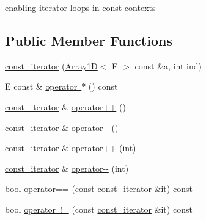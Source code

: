 enabling iterator loops in const contexts \subsection*{Public Member Functions}
\begin{DoxyCompactItemize}
\item 
\mbox{\hyperlink{classbridges_1_1datastructure_1_1_array1_d_1_1const__iterator_a1ea421b46a3f0907190a91752e1f5b32}{const\+\_\+iterator}} (\mbox{\hyperlink{classbridges_1_1datastructure_1_1_array1_d}{Array1D}}$<$ E $>$ const \&a, int ind)
\item 
E const  \& \mbox{\hyperlink{classbridges_1_1datastructure_1_1_array1_d_1_1const__iterator_a66a228b90b4be506b83ae663f772b1ef}{operator $\ast$}} () const
\item 
\mbox{\hyperlink{classbridges_1_1datastructure_1_1_array1_d_1_1const__iterator}{const\+\_\+iterator}} \& \mbox{\hyperlink{classbridges_1_1datastructure_1_1_array1_d_1_1const__iterator_a754c1601b52473d4c8abc5e20af62b81}{operator++}} ()
\item 
\mbox{\hyperlink{classbridges_1_1datastructure_1_1_array1_d_1_1const__iterator}{const\+\_\+iterator}} \& \mbox{\hyperlink{classbridges_1_1datastructure_1_1_array1_d_1_1const__iterator_a700c9de64036c2cb61836e1ddc23cc1c}{operator-\/-\/}} ()
\item 
\mbox{\hyperlink{classbridges_1_1datastructure_1_1_array1_d_1_1const__iterator}{const\+\_\+iterator}} \& \mbox{\hyperlink{classbridges_1_1datastructure_1_1_array1_d_1_1const__iterator_aa7eb1bbe97e8f3257dc7d850be8f5937}{operator++}} (int)
\item 
\mbox{\hyperlink{classbridges_1_1datastructure_1_1_array1_d_1_1const__iterator}{const\+\_\+iterator}} \& \mbox{\hyperlink{classbridges_1_1datastructure_1_1_array1_d_1_1const__iterator_a815972df8b28780f88dac8133322e8ab}{operator-\/-\/}} (int)
\item 
bool \mbox{\hyperlink{classbridges_1_1datastructure_1_1_array1_d_1_1const__iterator_a004eca869afdc913a1d1a448bb4b7871}{operator==}} (const \mbox{\hyperlink{classbridges_1_1datastructure_1_1_array1_d_1_1const__iterator}{const\+\_\+iterator}} \&it) const
\item 
bool \mbox{\hyperlink{classbridges_1_1datastructure_1_1_array1_d_1_1const__iterator_a4a669671943605345dd6517b0cb07508}{operator !=}} (const \mbox{\hyperlink{classbridges_1_1datastructure_1_1_array1_d_1_1const__iterator}{const\+\_\+iterator}} \&it) const
\end{DoxyCompactItemize}


